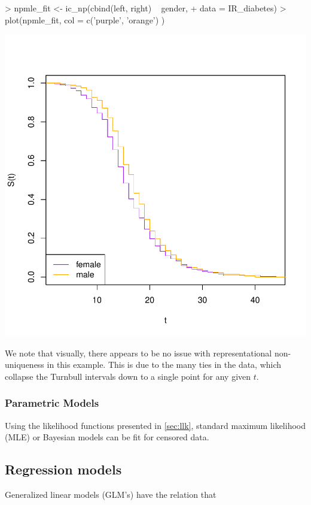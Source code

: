 \documentclass[a4paper]{article}
\begin{document}
\begin{Schunk}
\begin{Sinput}
> npmle_fit <- ic_np(cbind(left, right) ~ gender, 
+                    data = IR_diabetes)
> plot(npmle_fit, col = c('purple', 'orange') )
\end{Sinput}
\end{Schunk}
\includegraphics{StatisticalBackground-005}

We note that visually, there appears to be no issue with representational non-uniqueness in this example. This is due to the many ties in the data, which collapse the Turnbull intervals down to a single point for any given $t$. 

  \subsubsection{Parametric Models}

  Using the likelihood functions presented in \ref{sec:llk}, standard maximum likelihood (MLE) or Bayesian models can be fit for censored data. 

  \subsection{Regression models}
  
  Generalized linear models (GLM's) have the relation that 
  
\end{document}
